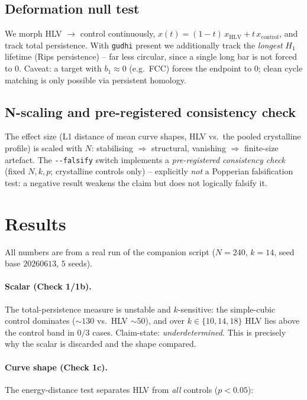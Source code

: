 \subsection{Deformation null test}
We morph HLV $\to$ control continuously, $x(t)=(1-t)\,x_{\mathrm{HLV}}
+ t\,x_{\mathrm{control}}$, and track total persistence. With \texttt{gudhi}
present we additionally track the \emph{longest} $H_1$ lifetime (Rips
persistence) -- far less circular, since a single long bar is not forced to
$0$. Caveat: a target with $b_1\approx 0$ (e.g.\ FCC) forces the endpoint to
$0$; clean cycle matching is only possible via persistent homology.

\subsection{N-scaling and pre-registered consistency check}
The effect size (L1 distance of mean curve shapes, HLV vs.\ the pooled
crystalline profile) is scaled with $N$: stabilising $\Rightarrow$ structural,
vanishing $\Rightarrow$ finite-size artefact. The \texttt{-{}-falsify} switch
implements a \emph{pre-registered consistency check} (fixed $N,k,p$;
crystalline controls only) -- explicitly \emph{not} a Popperian falsification
test: a negative result weakens the claim but does not logically falsify it.

\section{Results}

All numbers are from a real run of the companion script ($N=240$, $k=14$,
seed base $20260613$, $5$ seeds).

\paragraph{Scalar (Check 1/1b).} The total-persistence measure is unstable and
$k$-sensitive: the simple-cubic control dominates ($\sim\!130$ vs.\ HLV
$\sim\!50$), and over $k\in\{10,14,18\}$ HLV lies above the control band in
$0/3$ cases. Claim-state: \emph{underdetermined}. This is precisely why the
scalar is discarded and the shape compared.

\paragraph{Curve shape (Check 1c).} The energy-distance test separates HLV
from \emph{all} controls ($p<0.05$):


